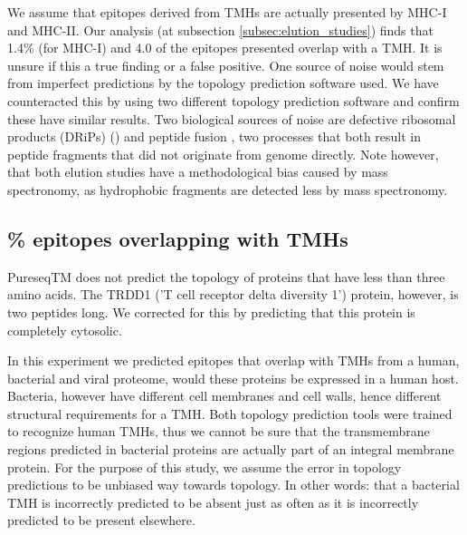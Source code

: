 We assume that epitopes 
derived from TMHs are actually presented by MHC-I and MHC-II.
Our analysis (at subsection \ref{subsec:elution_studies}) 
finds that 1.4\% (for MHC-I) and 4.0%
of the epitopes presented 
overlap with a TMH.
It is unsure if this a true finding or a false positive.
One source of noise would stem from imperfect predictions
by the topology prediction software used. 
We have counteracted this by using two different topology prediction
software and confirm these have similar results.
Two biological sources of noise 
are defective ribosomal products (DRiPs) (\cite{yewdell1996defective}) 
and peptide fusion \cite{delong2016pathogenic},
two processes that both result in peptide fragments
that did not originate from genome directly.
Note however, that both elution studies have a
methodological bias caused by mass spectronomy,
as hydrophobic fragments are detected less 
by mass spectronomy.

\subsection{\% epitopes overlapping with TMHs}



%
PureseqTM does not predict the topology
of proteins that have less than three amino acids. 
The TRDD1 ('T cell receptor delta diversity 1') protein,
however, is two peptides long. 
We corrected for this by predicting that this protein
is completely cytosolic.

%
In this experiment we predicted epitopes that overlap with 
TMHs from a human, bacterial and viral proteome,
would these proteins be expressed in a human host.
Bacteria, however have different cell membranes and cell walls, 
hence different structural requirements for a TMH.
Both topology prediction tools were trained to recognize
human TMHs, thus we cannot be sure that
the transmembrane regions predicted in bacterial proteins
are actually part of an integral membrane protein.
For the purpose of this study, we assume the 
error in topology predictions to be unbiased way towards topology.
In other words: that a bacterial TMH is incorrectly
predicted to be absent just as often as it is incorrectly
predicted to be present elsewhere.

